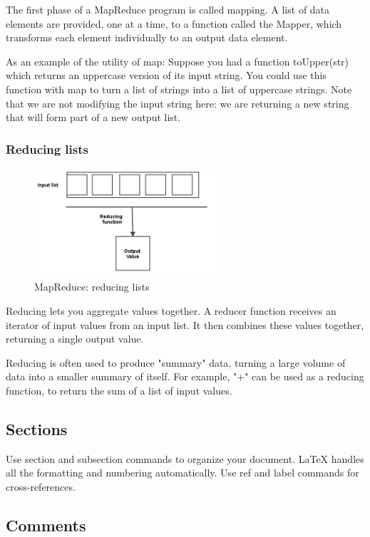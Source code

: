 The first phase of a MapReduce program is called mapping. A list of data elements are provided, one at a time, to a function called the Mapper, which transforms each element individually to an output data element.

As an example of the utility of map: Suppose you had a function toUpper(str) which returns an uppercase version of its input string. You could use this function with map to turn a list of strings into a list of uppercase strings. Note that we are not modifying the input string here: we are returning a new string that will form part of a new output list.

\subsubsection{Reducing lists}

\begin{figure}
\centering
\includegraphics[width=0.6\textwidth]{../images/mapreduce2.png}
\caption{\label{fig:frog}MapReduce: reducing lists}
\end{figure}

Reducing lets you aggregate values together. A reducer function receives an iterator of input values from an input list. It then combines these values together, returning a single output value.

Reducing is often used to produce "summary" data, turning a large volume of data into a smaller summary of itself. For example, "+" can be used as a reducing function, to return the sum of a list of input values.

\subsection{Sections}

Use section and subsection commands to organize your document. \LaTeX{} handles all the formatting and numbering automatically. Use ref and label commands for cross-references.

\subsection{Comments}

